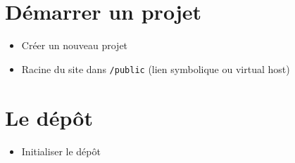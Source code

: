 \hypertarget{duxe9marrer-un-projet}{%
\section{Démarrer un projet}\label{duxe9marrer-un-projet}}

\begin{itemize}
\tightlist
\item
  Créer un nouveau projet
\end{itemize}

\begin{english}

\begin{Shaded}
\begin{Highlighting}[]
\NormalTok{$ }
\NormalTok{$ }
\NormalTok{$ }
\end{Highlighting}
\end{Shaded}

\end{english}

\begin{itemize}
\tightlist
\item
  Racine du site dans \textenglish{\texttt{/public}} (lien symbolique ou
  virtual host)
\end{itemize}

\hypertarget{le-duxe9puxf4t}{%
\section{Le dépôt}\label{le-duxe9puxf4t}}

\begin{itemize}
\tightlist
\item
  Initialiser le dépôt
\end{itemize}

\begin{english}

\begin{Shaded}
\begin{Highlighting}[]
 
 
 
 
 
 
\end{Highlighting}
\end{Shaded}

\end{english}

